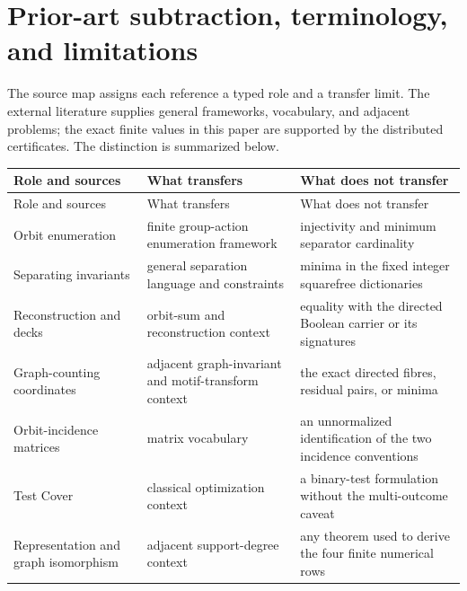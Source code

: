 \section{Prior-art subtraction, terminology, and limitations}
\label{sec:sources-limits}

The source map assigns each reference a typed role and a transfer limit.  The
external literature supplies general frameworks, vocabulary, and adjacent
problems; the exact finite values in this paper are supported by the
distributed certificates.  The distinction is summarized below.

\begin{longtable}{>{\raggedright\arraybackslash}p{}>{\raggedright\arraybackslash}p{}>{\raggedright\arraybackslash}p{}}
\toprule
Role and sources & What transfers & What does not transfer\\
\midrule
\endfirsthead
\toprule
Role and sources & What transfers & What does not transfer\\
\midrule
\endhead
Orbit enumeration \cite{Polya1937} & finite group-action enumeration framework & injectivity and minimum separator cardinality\\
Separating invariants \cite{Kemper2009,DufresneJeffries2015,KemperLopatinReimers2022} & general separation language and constraints & minima in the fixed integer squarefree dictionaries\\
Reconstruction and decks \cite{Mnukhin1992,Simon2018,DufresneEtAl2026} & orbit-sum and reconstruction context & equality with the directed Boolean carrier or its signatures\\
Graph-counting coordinates \cite{Thiery2000,Mikkonen2008,CurticapeanDellMarx2017,ArvindEtAl2019,BokerEtAl2023} & adjacent graph-invariant and motif-transform context & the exact directed fibres, residual pairs, or minima\\
Orbit-incidence matrices \cite{KramerMesner1976} & matrix vocabulary & an unnormalized identification of the two incidence conventions\\
Test Cover \cite{DeBontridderEtAl2003} & classical optimization context & a binary-test formulation without the multi-outcome caveat\\
Representation and graph isomorphism \cite{GrochowUrisman2026} & adjacent support-degree context & any theorem used to derive the four finite numerical rows\\
\bottomrule
\end{longtable}

